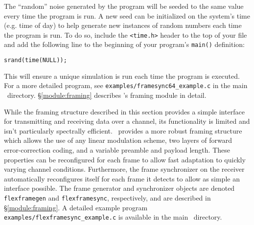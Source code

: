 The ``random'' noise generated by the program will be seeded to the same
value every time the program is run.
A new seed can be initialized on the system's time (e.g. time of day) to
help generate new instances of random numbers each time the program is
run.
To do so, include the {\tt <time.h>} header to the top of your file and
add the following line to the beginning of your program's {\tt main()}
definition:
%
\begin{Verbatim}[fontsize=\small]
    srand(time(NULL));
\end{Verbatim}
%
This will ensure a unique simulation is run each time the program is
executed.
For a more detailed program, see {\tt examples/framesync64\_example.c}
in the main \liquid\ directory.
\S\ref{module:framing} describes \liquid's framing module in
detail.


While the framing structure described in this section provides a simple
interface for transmitting and receiving data over a channel,
its functionality is limited and isn't particularly spectrally
efficient.
\liquid\ provides a more robust framing structure which allows the use
of any linear modulation scheme, two layers of forward error-correction
coding, and a variable preamble and payload length.
These properties can be reconfigured for each frame to allow fast
adaptation to quickly varying channel conditions.
Furthermore, the frame synchronizer on the receiver automatically
reconfigures itself for each frame it detects to allow as simple an
interface possible.
The frame generator and synchronizer objects are denoted
{\tt flexframegen} and
{\tt flexframesync},
respectively,
and are described in \S\ref{module:framing}.
A detailed example program {\tt examples/flexframesync\_example.c}
is available in the main \liquid\ directory.

